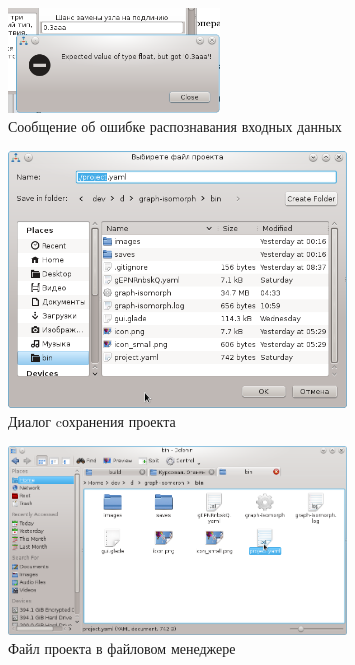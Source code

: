 \documentclass[russian,utf8,emptystyle]{eskdtext}
\begin{document}
\begin{figure}[h!]
\centering
\includegraphics[width=0.5\textwidth]{screen08}
\caption{Сообщение об ошибке распознавания входных данных}
\label{fig:parSelectError}
\end{figure}

\begin{figure}[h!]
\centering
\includegraphics[width=0.8\textwidth]{screen06}
\caption{Диалог cохранения проекта}
\label{fig:projectSaveDialog}
\end{figure}

\begin{figure}[h!]
\centering
\includegraphics[width=0.8\textwidth]{screen13}
\caption{Файл проекта в файловом менеджере}
\label{fig:projectSaveResult}
\end{figure}
\end{document}
